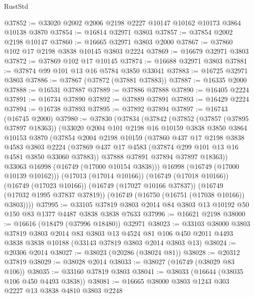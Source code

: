 \begin{lexlean}{RustStd}
\begin{coremodule}
@37852 := @33020 @2002 @2006 @2198 @2227 @10147 @10162 @10173 @3864 @10138 @3870
@37854 := @16814 @32971 @3803
@37857 := @37854 @2002 @2198 @10147
@37860 := @16665 @32971 @3803 @2000
@37867 := @37860 @102 @17 @2198 @3838 @10145 @3803 @2224
@37869 := @16679 @32971 @3803
@37872 := @37869 @102 @17 @10145
@37874 := @16688 @32971 @3803
@37881 := @37874 @99 @101 @13 @16 @5784 @3850 @33041
@37883 := @16725 @32971 @3803
@37886 := @37867 (@37872 (@37881 @37883))
@37887 := @16335 @2000
@37888 := @16531 @37887
@37889 := @37886 @37888
@37890 := @16405 @2224
@37891 := @16734 @37890
@37892 := @37889 @37891
@37893 := @16429 @2224
@37894 := @16738 @37893
@37895 := @37892 @37894
@37897 := @16743 (@16745 @2000)
@37980 := @37830
    (@37834
      (@37842
        (@37852
          (@37857 (@37895 @37897 @18363))
          (@33020
            @2004
            @101
            @2198
            @16
            @10159
            @3838
            @3850
            @3864
            @10153
            @3870
            (@37854
              @2004
              @2198
              @10159
              (@37860
                @437
                @17
                @2198
                @3838
                @4583
                @3803
                @2224
                (@37869 @437 @17 @4583 (@37874 @299 @101 @13 @16 @4581 @3850 @33060 @37883))
                @37888
                @37891
                @37894
                @37897
                @18363))
            @33063
            @16998
            (@16749 (@17000 @10154 @3838)))
          @16998
          (@16749 (@17000 @10139 @10162)))
        (@17013 (@17014 @10166))
        (@16749 (@17018 @10166))
        (@16749 (@17023 @10166))
        (@16749 (@17027 @10166 @37837))
        (@16749 (@17032 @1995 @37837 @37819))
        (@16749 (@16750 (@16751 (@17038 @10166)) @3803))))
@37995 := @33105 @37819 @3803 @2014 @84 @3803 @13 @10192 @50 @150 @83 @1377 @4487 @3838 @3838 @7633
@37996 := @16621 @2198
@38000 := @16616 (@18479 (@37996 @18480)) @32971
@38023 := @33103
    @38000
    @3803
    @37819
    @3803
    @2014
    @83
    @3803
    @13
    @4524
    @81
    @106
    @450
    @2011
    @4493
    @3838
    @3838
    @10188
    (@33143 @37819 @3803 @2014 @3803 @13)
@38024 := @20306 @2014
@38027 := @38023 (@20286 (@38024 @81))
@38028 := @20312 @37819
@38029 := @38028 @2014
@38033 := @38027 (@16749 (@38029 @83 @106))
@38035 := @33160 @37819 @3803
@38041 := @38033 (@16644 (@38035 @106 @450 @4493 @3838))
@38081 := @16665
    @38000
    @3803
    @1243
    @303
    @2227
    @13
    @3838
    @4810
    @3803
    @2248

\end{coremodule}
\end{lexlean}
